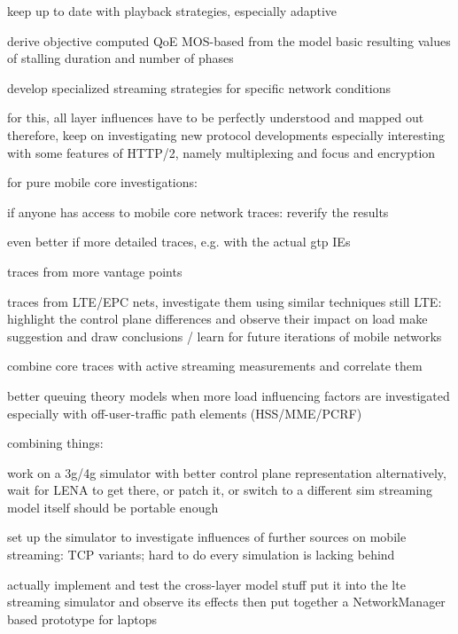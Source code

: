 	keep up to date with playback strategies, especially adaptive

	derive objective computed \gls{QoE} \gls{MOS}-based from the model basic resulting values of stalling duration and number of phases

	develop specialized streaming strategies for specific network conditions

	for this, all layer influences have to be perfectly understood and mapped out
	therefore, keep on investigating new protocol developments
	especially interesting with some features of HTTP/2, namely multiplexing and focus and encryption


for pure mobile core investigations:

	if anyone has access to mobile core network traces: reverify the results

	even better if more detailed traces, e.g. with the actual \gls{gtp} \glspl{IE}

	traces from more vantage points

	traces from \gls{LTE}/\gls{EPC} nets, investigate them using similar techniques
	still LTE: highlight the control plane differences and observe their impact on load
	make suggestion and draw conclusions / learn for future iterations of mobile networks

	combine core traces with active streaming measurements and correlate them

	better queuing theory models when more load influencing factors are investigated
	especially with off-user-traffic path elements (HSS/MME/PCRF)


combining things:

	work on a 3g/4g simulator with better control plane representation
	alternatively, wait for LENA to get there, or patch it, or switch to a different sim
	streaming model itself should be portable enough

	set up the simulator to investigate influences of further sources on mobile streaming:
	TCP variants; hard to do every simulation is lacking behind


	actually implement and test the cross-layer model stuff
	put it into the lte streaming simulator and observe its effects
	then put together a NetworkManager based prototype for laptops
